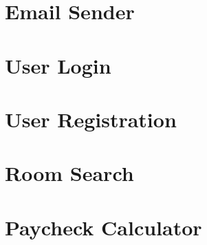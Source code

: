 \begin{appendices}
\lstset{
  numbers=none,
  firstnumber=1,
  numberfirstline=true
}

\section{Email Sender}


\section{User Login}


\section{User Registration}


\section{Room Search}


\section{Paycheck Calculator}


\end{appendices}